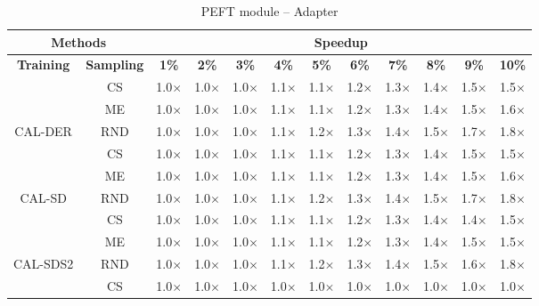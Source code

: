 \begin{table}[htbp]
\centering
\begin{subtable}{\linewidth}
\centering
\caption{PEFT module -- Adapter}

\begin{tabular}{c|c|cccccccccc}
\toprule
\multicolumn{2}{c|}{\textbf{Methods}} & \multicolumn{10}{c}{\textbf{Speedup}} \\
\midrule
\textbf{Training} & \textbf{Sampling} & \textbf{1\%} & \textbf{2\%} & \textbf{3\%} & \textbf{4\%} & \textbf{5\%} & \textbf{6\%} & \textbf{7\%} & \textbf{8\%} & \textbf{9\%} & \textbf{10\%}\\
\midrule
 & CS & 1.0$\times$ & 1.0$\times$ & 1.0$\times$ & 1.1$\times$ & 1.1$\times$ & 1.2$\times$ & 1.3$\times$ & 1.4$\times$ & 1.5$\times$ & 1.5$\times$\\

 & ME & 1.0$\times$ & 1.0$\times$ & 1.0$\times$ & 1.1$\times$ & 1.1$\times$ & 1.2$\times$ & 1.3$\times$ & 1.4$\times$ & 1.5$\times$ & 1.6$\times$\\

\multirow{-3}{*}{\raggedright\arraybackslash CAL-DER} & RND & 1.0$\times$ & 1.0$\times$ & 1.0$\times$ & 1.1$\times$ & 1.2$\times$ & 1.3$\times$ & 1.4$\times$ & 1.5$\times$ & 1.7$\times$ & 1.8$\times$\\
\midrule
 & CS & 1.0$\times$ & 1.0$\times$ & 1.0$\times$ & 1.1$\times$ & 1.1$\times$ & 1.2$\times$ & 1.3$\times$ & 1.4$\times$ & 1.5$\times$ & 1.5$\times$\\

 & ME & 1.0$\times$ & 1.0$\times$ & 1.0$\times$ & 1.1$\times$ & 1.1$\times$ & 1.2$\times$ & 1.3$\times$ & 1.4$\times$ & 1.5$\times$ & 1.6$\times$\\

\multirow{-3}{*}{\raggedright\arraybackslash CAL-SD} & RND & 1.0$\times$ & 1.0$\times$ & 1.0$\times$ & 1.1$\times$ & 1.2$\times$ & 1.3$\times$ & 1.4$\times$ & 1.5$\times$ & 1.7$\times$ & 1.8$\times$\\
\midrule
 & CS & 1.0$\times$ & 1.0$\times$ & 1.0$\times$ & 1.1$\times$ & 1.1$\times$ & 1.2$\times$ & 1.3$\times$ & 1.4$\times$ & 1.4$\times$ & 1.5$\times$\\

 & ME & 1.0$\times$ & 1.0$\times$ & 1.0$\times$ & 1.1$\times$ & 1.1$\times$ & 1.2$\times$ & 1.3$\times$ & 1.4$\times$ & 1.5$\times$ & 1.5$\times$\\

\multirow{-3}{*}{\raggedright\arraybackslash CAL-SDS2} & RND & 1.0$\times$ & 1.0$\times$ & 1.0$\times$ & 1.1$\times$ & 1.2$\times$ & 1.3$\times$ & 1.4$\times$ & 1.5$\times$ & 1.6$\times$ & 1.8$\times$\\
\midrule
 & CS & 1.0$\times$ & 1.0$\times$ & 1.0$\times$ & 1.0$\times$ & 1.0$\times$ & 1.0$\times$ & 1.0$\times$ & 1.0$\times$ & 1.0$\times$ & 1.0$\times$\\


\end{tabular}
\end{subtable}
\end{table}
